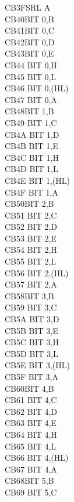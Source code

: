 \begin{multicols}{3}
{\begin{tabbing}
    CB3F\>SRL A\\
    CB40\>BIT 0,B\\
    CB41\>BIT 0,C\\
    CB42\>BIT 0,D\\
    CB43\>BIT 0,E\\
    CB44\> 	BIT 0,H\\
    CB45\> 	BIT 0,L\\
    CB46\> 	BIT 0,(HL)\\
    CB47\> 	BIT 0,A\\
    CB48\>BIT 1,B\\
    CB49\> 	BIT 1,C\\
    CB4A\> 	BIT 1,D\\
    CB4B\> 	BIT 1,E\\
    CB4C\> 	BIT 1,H\\
    CB4D\> 	BIT 1,L\\
    CB4E\> 	BIT 1,(HL)\\
    CB4F\> 	BIT 1,A\\
    CB50\>BIT 2,B\\
    CB51\> 	BIT 2,C\\
    CB52\> 	BIT 2,D\\
    CB53\> 	BIT 2,E\\
    CB54\> 	BIT 2,H\\
    CB55\> 	BIT 2,L\\
    CB56\> 	BIT 2,(HL)\\
    CB57\> 	BIT 2,A\\
    CB58\>BIT 3,B\\
    CB59\> 	BIT 3,C\\
    CB5A\> 	BIT 3,D\\
    CB5B\> 	BIT 3,E\\
    CB5C\> 	BIT 3,H\\
    CB5D\> 	BIT 3,L\\
    CB5E\> 	BIT 3,(HL)\\
    CB5F\> 	BIT 3,A\\
    CB60\>BIT 4,B\\
    CB61\> 	BIT 4,C\\
    CB62\> 	BIT 4,D\\
    CB63\> 	BIT 4,E\\
    CB64\> 	BIT 4,H\\
    CB65\> 	BIT 4,L\\
    CB66\> 	BIT 4,(HL)\\
    CB67\> 	BIT 4,A\\
    CB68\>BIT 5,B\\
    CB69\> 	BIT 5,C\\

\end{tabbing}}
\end{multicols}
